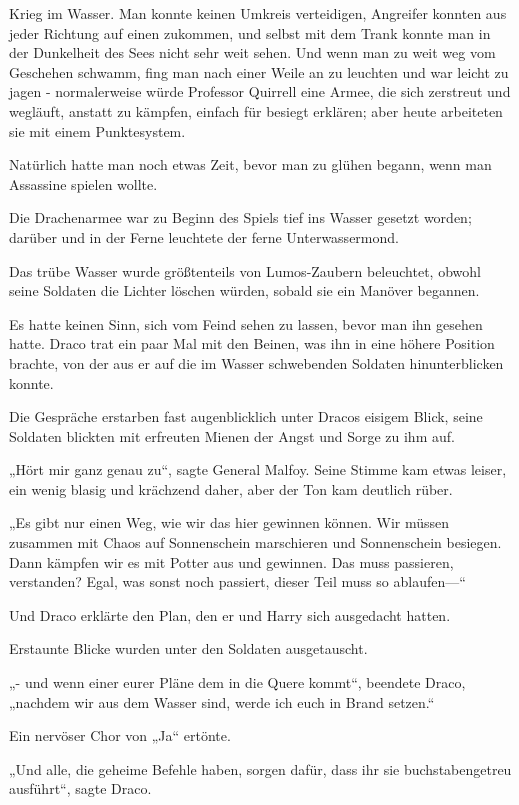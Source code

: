 {Krieg im Wasser. Man konnte keinen Umkreis verteidigen, Angreifer konnten aus jeder Richtung auf einen zukommen, und selbst mit dem Trank konnte man in der Dunkelheit des Sees nicht sehr weit sehen. Und wenn man zu weit weg vom Geschehen schwamm, fing man nach einer Weile an zu leuchten und war leicht zu jagen - normalerweise würde Professor Quirrell eine Armee, die sich zerstreut und wegläuft, anstatt zu kämpfen, einfach für besiegt erklären; aber heute arbeiteten sie mit einem Punktesystem.

Natürlich hatte man noch etwas Zeit, bevor man zu glühen begann, wenn man Assassine spielen wollte.

Die Drachenarmee war zu Beginn des Spiels tief ins Wasser gesetzt worden; darüber und in der Ferne leuchtete der ferne Unterwassermond.

Das trübe Wasser wurde größtenteils von Lumos-Zaubern beleuchtet, obwohl seine Soldaten die Lichter löschen würden, sobald sie ein Manöver begannen.

Es hatte keinen Sinn, sich vom Feind sehen zu lassen, bevor man ihn gesehen hatte. Draco trat ein paar Mal mit den Beinen, was ihn in eine höhere Position brachte, von der aus er auf die im Wasser schwebenden Soldaten hinunterblicken konnte.

Die Gespräche erstarben fast augenblicklich unter Dracos eisigem Blick, seine Soldaten blickten mit erfreuten Mienen der Angst und Sorge zu ihm auf.

„Hört mir ganz genau zu“, sagte General Malfoy. Seine Stimme kam etwas leiser, ein wenig blasig und krächzend daher, aber der Ton kam deutlich rüber.

„Es gibt nur einen Weg, wie wir das hier gewinnen können. Wir müssen zusammen mit Chaos auf Sonnenschein marschieren und Sonnenschein besiegen. Dann kämpfen wir es mit Potter aus und gewinnen. Das muss passieren, verstanden? Egal, was sonst noch passiert, dieser Teil muss so ablaufen—“

Und Draco erklärte den Plan, den er und Harry sich ausgedacht hatten.

Erstaunte Blicke wurden unter den Soldaten ausgetauscht.

„- und wenn einer eurer Pläne dem in die Quere kommt“, beendete Draco, „nachdem wir aus dem Wasser sind, werde ich euch in Brand setzen.“

Ein nervöser Chor von „Ja“ ertönte.

„Und alle, die geheime Befehle haben, sorgen dafür, dass ihr sie buchstabengetreu ausführt“, sagte Draco.

}
